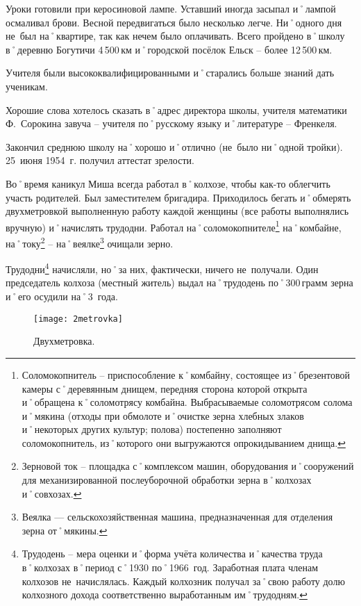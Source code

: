 Уроки готовили при керосиновой лампе. Уставший иногда засыпал и˚лампой осмаливал брови. Весной передвигаться было несколько легче. Ни˚одного дня не~был на˚квартире, так как нечем было оплачивать. Всего пройдено в˚школу в˚деревню Богутичи 4\,500\,км и˚городской посёлок Ельск \--- более 12\,500\,км. 

Учителя были высококвалифицированными и˚старались больше знаний дать ученикам.

Хорошие слова хотелось сказать в˚адрес директора школы, учителя математики Ф.~Сорокина завуча \--- учителя по˚русскому языку и˚литературе \--- Френкеля. 

Закончил среднюю школу на˚хорошо и˚отлично (не~было ни˚одной тройки). 25~июня 1954~г. получил аттестат зрелости.

Во˚время каникул Миша всегда работал в˚колхозе, чтобы как-то облегчить участь родителей. Был заместителем бригадира. Приходилось бегать и˚обмерять двухметровкой выполненную работу каждой женщины (все работы выполнялись вручную) и˚начислять трудодни. Работал на˚соломокопнителе\footnote{Соломокопнитель \--- приспособление к˚комбайну, состоящее из˚брезентовой камеры с˚деревянным днищем, передняя сторона которой открыта и˚обращена к˚соломотрясу комбайна. Выбрасываемые соломотрясом солома и˚мякина (отходы при обмолоте и˚очистке зерна хлебных злаков и˚некоторых других культур; полова) постепенно заполняют соломокопнитель, из˚которого они выгружаются опрокидыванием днища.} на˚комбайне, на˚току\footnote{Зерновой ток \--- площадка с˚комплексом машин, оборудования и˚сооружений для механизированной послеуборочной обработки зерна в˚колхозах и˚совхозах.} \--- на˚веялке\footnote{Веялка — сельскохозяйственная машина, предназначенная для отделения зерна от˚мякины.} очищали зерно.

Трудодни\footnote{Трудодень \--- мера оценки и˚форма учёта количества и˚качества труда в˚колхозах в˚период с˚1930 по˚1966~год. Заработная плата членам колхозов не~начислялась. Каждый колхозник получал за˚свою работу долю колхозного дохода соответственно выработанным им˚трудодням.} начисляли, но˚за них, фактически, ничего не~получали. Один председатель колхоза (местный житель) выдал на˚трудодень по˚300\,грамм зерна и˚его осудили на˚3~года.

\begin{wrapfigure}{O}{.25\textwidth}
\centering
\texttt{[image: 2metrovka]}
\caption[Двухметровка.]{Двухметровка\footnotemark.}
\label{fig:2metrovka}
\end{wrapfigure}

